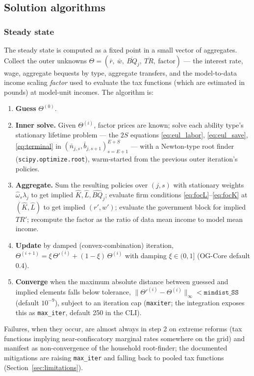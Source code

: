 \subsection{Solution algorithms}
\label{subsec:solution}

\subsubsection{Steady state}
\label{subsubsec:sssolve}

The steady state is computed as a fixed point in a small vector of aggregates. Collect the outer unknowns $\Theta = (\bar{r},\ \bar{w},\ \overline{BQ}_j,\ \overline{TR},\ \text{factor})$ --- the interest rate, wage, aggregate bequests by type, aggregate transfers, and the model-to-data income scaling \emph{factor} used to evaluate the tax functions (which are estimated in pounds) at model-unit incomes. The algorithm is:
\begin{enumerate}
\item \textbf{Guess} $\Theta^{(0)}$.
\item \textbf{Inner solve.} Given $\Theta^{(i)}$, factor prices are known; solve each ability type's stationary lifetime problem --- the $2S$ equations \eqref{eq:eul_labor}, \eqref{eq:eul_save}, \eqref{eq:terminal} in $(\bar{n}_{j,s},\bar{b}_{j,s+1})_{s=E+1}^{E+S}$ --- with a Newton-type root finder (\texttt{scipy.optimize.root}), warm-started from the previous outer iteration's policies.
\item \textbf{Aggregate.} Sum the resulting policies over $(j,s)$ with stationary weights $\hat{\omega}_s\lambda_j$ to get implied $\hat{K}, \hat{L}, \widehat{BQ}_j$; evaluate firm conditions \eqref{eq:focL}--\eqref{eq:focK} at $(\hat K,\hat L)$ to get implied $(r',w')$; evaluate the government block for implied $TR'$; recompute the factor as the ratio of data mean income to model mean income.
\item \textbf{Update} by damped (convex-combination) iteration, $\Theta^{(i+1)} = \xi\,\Theta'^{(i)} + (1-\xi)\,\Theta^{(i)}$ with damping $\xi\in(0,1]$ (OG-Core default 0.4).
\item \textbf{Converge} when the maximum absolute distance between guessed and implied elements falls below tolerance, $\lVert \Theta'^{(i)}-\Theta^{(i)}\rVert_\infty < \texttt{mindist\_SS}$ (default $10^{-9}$), subject to an iteration cap (\texttt{maxiter}; the integration exposes this as \texttt{max\_iter}, default 250 in the CLI).
\end{enumerate}
Failures, when they occur, are almost always in step 2 on extreme reforms (tax functions implying near-confiscatory marginal rates somewhere on the grid) and manifest as non-convergence of the household root-finder; the documented mitigations are raising \texttt{max\_iter} and falling back to pooled tax functions (Section~\ref{sec:limitations}).

